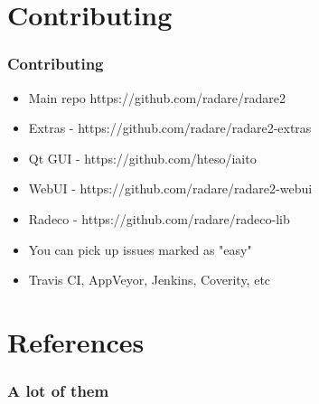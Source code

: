 \documentclass[10pt,pdf,utf8,english,compress,hyperref={unicode}]{beamer}
\begin{document}
\section{Contributing}

\begin{frame}[fragile]
  \frametitle{Contributing}
  \begin{itemize}
	  \item Main repo https://github.com/radare/radare2
	  \item Extras - https://github.com/radare/radare2-extras
	  \item Qt GUI - https://github.com/hteso/iaito
	  \item WebUI - https://github.com/radare/radare2-webui
	  \item Radeco - https://github.com/radare/radeco-lib
	  \item You can pick up issues marked as "easy"
	  \item Travis CI, AppVeyor, Jenkins, Coverity, etc
  \end{itemize}
\end{frame}

\ifxetex
\else
\section{References}
\begin{frame}[allowframebreaks]
	\frametitle{A lot of them}
	\printbibliography
\end{frame}
\fi
\end{document}
